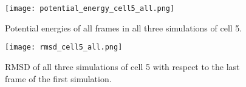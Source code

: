 \begin{figure}[ht]
\centering
  \texttt{[image: potential\_energy\_cell5\_all.png]}
  \caption{Potential energies of all frames in all three simulations of cell 5.}
  \label{fig:potential_energy_cell5_all}
\end{figure}

\begin{figure}[ht]
\centering
  \texttt{[image: rmsd\_cell5\_all.png]}
  \caption{RMSD of all three simulations of cell 5 with respect to the last frame of the first simulation.}
  \label{fig:rmsd_cell5_all}
\end{figure}




